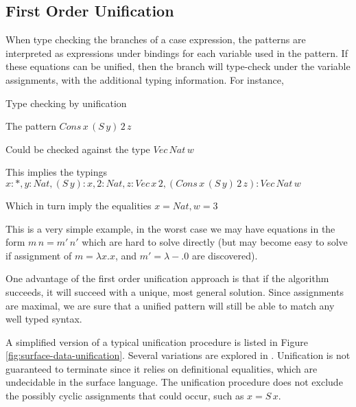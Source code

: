 


\subsection{First Order Unification}

When type checking the branches of a case expression, the patterns are interpreted as expressions under bindings for each variable used in the pattern.
If these equations can be unified, then the branch will type-check under the variable assignments, with the additional typing information.
For instance,
\begin{example}
Type checking by unification

The pattern $Cons\,x\,\left(S\,y\right)\,2\,z$

Could be checked against the type $Vec\,Nat\,w$

This implies the typings $x:*,y:Nat,\left(S\,y\right):x,2:Nat,z:Vec\,x\,2,\left(Cons\,x\,\left(S\,y\right)\,2\,z\right):Vec\,Nat\,w$

Which in turn imply the equalities $x=Nat,w=3$
\end{example}

This is a very simple example, in the worst case we may have equations in the form $m\,n=m'\,n'$ which are hard to solve directly (but may become easy to solve if assignment of $m=\lambda x.x$, and $m'=\lambda-.0$ are discovered).

One advantage of the first order unification approach is that if the algorithm succeeds, it will succeed with a unique, most general solution.
Since assignments are maximal, we are sure that a unified pattern will still be able to match any well typed syntax.

A simplified version of a typical unification procedure is listed in Figure \ref{fig:surface-data-unification}.
Several variations are explored in \cite{cockx_devriese_2018}.
Unification is not guaranteed to terminate since it relies on definitional equalities, which are undecidable in the surface language.
The unification procedure does not exclude the possibly cyclic assignments that could occur, such as $x=S\,x$. 


